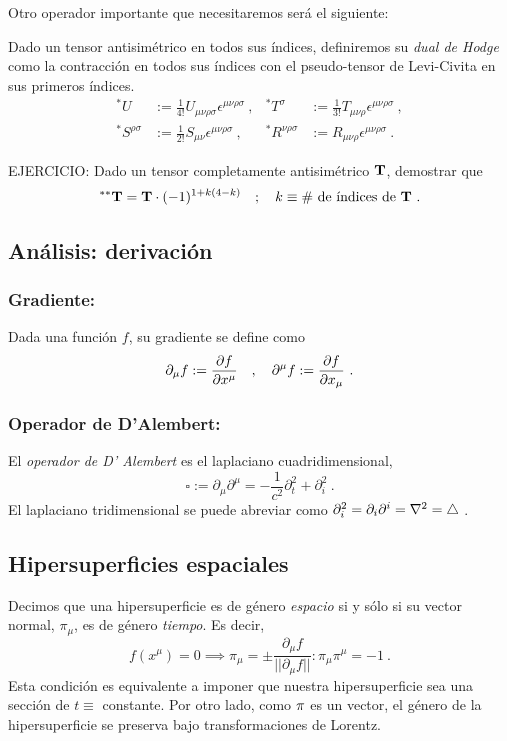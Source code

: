 Otro operador importante que necesitaremos será el siguiente:\\

\begin{define}
    Dado un tensor antisimétrico en todos sus índices, definiremos su \emph{dual de Hodge} como la contracción en todos sus índices con el pseudo-tensor de Levi-Civita en sus primeros índices.
    \begin{align*}
        ^* U &:= \frac{1}{4!} U_{\mu \nu \rho \sigma } \epsilon^{\mu \nu \rho \sigma}\ ,  & ^*T^\sigma &:= \frac{1}{3!}T_{\mu \nu \rho }\epsilon^{\mu \nu \rho \sigma} \ ,\\
        ^*S^{\rho \sigma} &:= \frac{1}{2!} S_{\mu \nu }\epsilon^{\mu \nu \rho \sigma}\ , & ^*R^{\nu \rho \sigma } &:= R_{\mu \nu \rho}\epsilon^{\mu \nu \rho \sigma}\ .
    \end{align*}
\end{define}
\begin{mybox}
    EJERCICIO: Dado un tensor completamente antisimétrico $\mathbf{T}$, demostrar que 
    $$
    ^{**}\mathbf{T} = \mathbf{T} \cdot (-1)^{1+k(4-k)} \quad ; \quad k\equiv \text{\#\ de índices de }\mathbf{T} \ .
    $$
\end{mybox}
\subsection{Análisis: derivación}
\subsubsection{Gradiente:}
Dada una función $f$, su gradiente se define como
$$
\partial_\mu f := \pdv{f}{x^\mu } \quad , \quad \partial^\mu f:= \pdv{f}{x_\mu } \ .
$$
\subsubsection{Operador de D'Alembert:}
El \emph{operador de D' Alembert} es el laplaciano cuadridimensional,
$$
\square := \partial_\mu \partial ^\mu = -\frac{1}{c^2}\partial_t^2 + \partial_i ^2 \ .
$$
El laplaciano tridimensional se puede abreviar como $\partial_i^2 = \partial_i \partial ^i = \laplacian = \triangle$ .
\subsection{Hipersuperficies espaciales}
Decimos que una hipersuperficie es de género \emph{espacio} si y sólo si su vector normal, $\pi_\mu $, es de género \emph{tiempo}. Es decir,
$$
f(x^\mu) = 0 \implies  \pi_\mu = \pm \frac{\partial_\mu f}{||\partial_\mu f||}: \pi_\mu \pi^\mu = -1 \ .
$$
Esta condición es equivalente a imponer que nuestra hipersuperficie sea una sección de $t\equiv $ constante. Por otro lado, como $\mathbf{\pi}$ es un vector, el género de la hipersuperficie se preserva bajo transformaciones de Lorentz.
